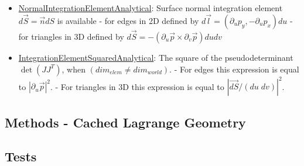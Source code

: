 \begin{itemize}
\item \uline{NormalIntegrationElementAnalytical}: Surface normal integration element $d\vec{S} = \vec{n} dS $ is available
		\subitem - for edges in 2D defined by $d\vec{l} = (\partial_u p_y, -\partial_u p_x) du$
		\subitem - for triangles in 3D defined by $d \vec{S} = -(\partial_u \vec{p} \times \partial_v \vec{p}) du dv $
\item \uline{IntegrationElementSquaredAnalytical}: The square of the pseudodeterminant $\det(JJ^T)$, when $(dim_{elem} \neq dim_{world})$.
		\subitem - For edges this expression is equal to $|\partial_u \vec{p}|^2$.
		\subitem - For triangles in 3D this expression is equal to $|\vec{dS} / (du \; dv)|^2$.

\end{itemize}


\subsection{Methods - Cached Lagrange Geometry}



\subsection{Tests}

